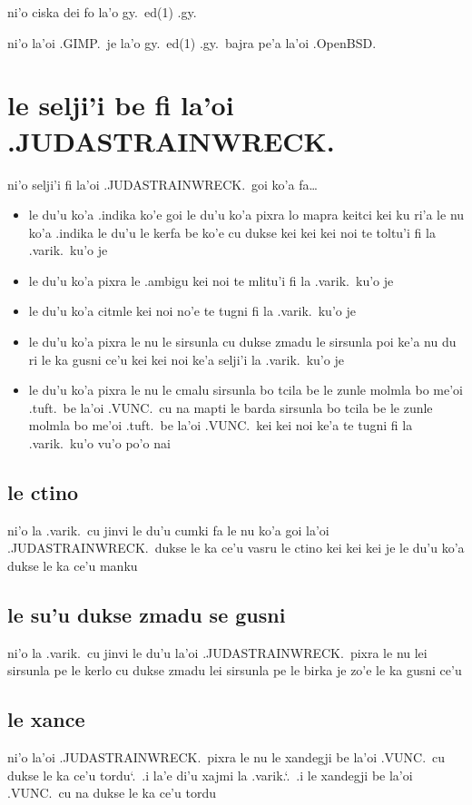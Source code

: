 \documentclass{report}
\newcommand\sds{\spacefactor\sfcode`.\ \space}
\begin{document}
ni'o ciska dei fo la'o gy.\ ed(1) .gy.

ni'o la'oi .GIMP.\ je la'o gy.\ ed(1) .gy.\ bajra pe'a la'oi .OpenBSD.

\section{le selji'i be fi la'oi .JUDASTRAINWRECK.}
ni'o selji'i fi la'oi .JUDASTRAINWRECK.\ goi ko'a fa\ldots
\begin{itemize}
	\item le du'u ko'a .indika ko'e goi le du'u ko'a pixra lo mapra keitci kei ku ri'a le nu ko'a .indika le du'u le kerfa be ko'e cu dukse kei kei kei noi te toltu'i fi la .varik.\ ku'o je
	\item le du'u ko'a pixra le .ambigu kei noi te mlitu'i fi la .varik.\ ku'o je
	\item le du'u ko'a citmle kei noi no'e te tugni fi la .varik.\ ku'o je
	\item le du'u ko'a pixra le nu le sirsunla cu dukse zmadu le sirsunla poi ke'a nu du ri le ka gusni ce'u kei kei noi ke'a selji'i la .varik.\ ku'o je
	\item le du'u ko'a pixra le nu le cmalu sirsunla bo tcila be le zunle molmla bo me'oi .tuft.\ be la'oi .VUNC.\ cu na mapti le barda sirsunla bo tcila be le zunle molmla bo me'oi .tuft.\ be la'oi .VUNC.\ kei kei noi ke'a te tugni fi la .varik.\ ku'o
vu'o po'o nai
\end{itemize}

\subsection{le ctino}
ni'o la .varik.\ cu jinvi le du'u cumki fa le nu ko'a goi la'oi .JUDASTRAINWRECK.\ dukse le ka ce'u vasru le ctino kei kei kei je le du'u ko'a dukse le ka ce'u manku

\subsection{le su'u dukse zmadu se gusni}
ni'o la .varik.\ cu jinvi le du'u la'oi .JUDASTRAINWRECK.\ pixra le nu lei sirsunla pe le kerlo cu dukse zmadu lei sirsunla pe le birka je zo'e le ka gusni ce'u

\subsection{le xance}
ni'o la'oi .JUDASTRAINWRECK.\ pixra le nu le xandegji be la'oi .VUNC.\ cu dukse le ka ce'u tordu\sds  .i la'e di'u xajmi la .varik.\sds  .i le xandegji be la'oi .VUNC.\ cu na dukse le ka ce'u tordu
\end{document}
